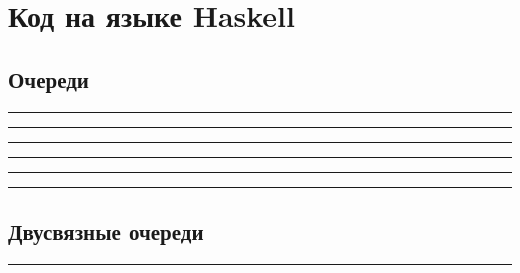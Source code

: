 \appendix
\chapter{Код на языке Haskell}
\label{app:A}

\section{Очереди}

\hrule

\hrule

\hrule

\hrule

\hrule

\hrule


\section{Двусвязные очереди}

\hrule



